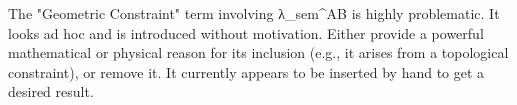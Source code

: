 The "Geometric Constraint" term involving λ_sem^AB is highly problematic. It looks ad hoc and is introduced without motivation. Either provide a powerful mathematical or physical reason for its inclusion (e.g., it arises from a topological constraint), or remove it. It currently appears to be inserted by hand to get a desired result.


